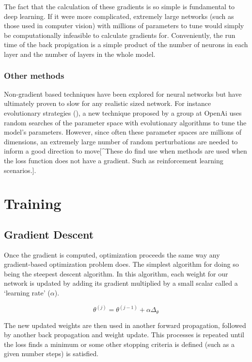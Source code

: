 \documentclass[]{book}
\theoremstyle{definition}
\theoremstyle{definition}
\theoremstyle{definition}
\theoremstyle{remark}
\begin{document}
The fact that the calculation of these gradients is so simple is
fundamental to deep learning. If it were more complicated, extremely
large networks (such as those used in computer vision) with millions of
parameters to tune would simply be computationally infeasible to
calculate gradients for. Conveniently, the run time of the back
propigation is a simple product of the number of neurons in each layer
and the number of layers in the whole model.

\subsubsection{Other methods}\label{other-methods}

Non-gradient based techniques have been explored for neural networks but
have ultimately proven to slow for any realistic sized network. For
instance evolutionary strategies (\citet{evostrat}), a new technique
proposed by a group at OpenAi uses random searches of the parameter
space with evolutionary algorithms to tune the model's parameters.
However, since often these parameter spaces are millions of dimensions,
an extremely large number of random perturbations are needed to inform a
good direction to move{[}\^{}These do find use when methods are used
when the loss function does not have a gradient. Such as reinforcement
learning scenarios.{]}.

\section{Training}\label{training}

\subsection{Gradient Descent}\label{gradient-descent}

Once the gradient is computed, optimization proceeds the same way any
gradient-based optimization problem does. The simplest algorithm for
doing so being the steepest descent algorithm. In this algorithm, each
weight for our network is updated by adding its gradient multiplied by a
small scalar called a `learning rate' (\(\alpha\)).

\[\theta^{(j)} = \theta^{(j - 1)} + \alpha\Delta_{\theta}\]

The new updated weights are then used in another forward propagation,
followed by another back propagation and weight update. This processes
is repeated until the loss finds a minimum or some other stopping
criteria is defined (such as a given number steps) is satisfied.
\end{document}
